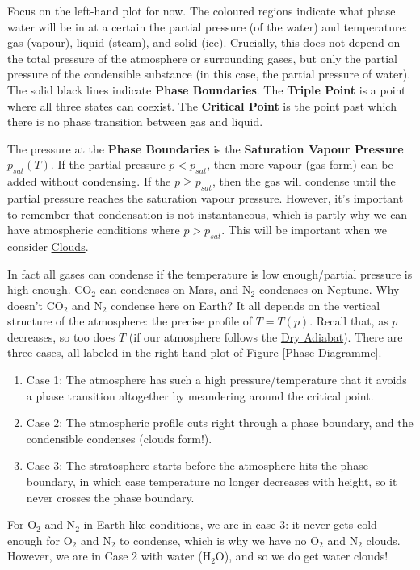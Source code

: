 Focus on the left-hand plot for now. The coloured regions indicate what phase water will be in at a certain the partial pressure (of the water) and temperature: gas (vapour), liquid (steam), and solid (ice). Crucially, this does not depend on the total pressure of the atmosphere or surrounding gases, but only the partial pressure of the condensible substance (in this case, the partial pressure of water). The solid black lines indicate \textbf{Phase Boundaries}. The \textbf{Triple Point} is a point where all three states can coexist. The \textbf{Critical Point} is the point past which there is no phase transition between gas and liquid.

The pressure at the \textbf{Phase Boundaries} is the \textbf{Saturation Vapour Pressure} $p_{sat}(T)$. If the partial pressure $p<p_{sat}$, then more vapour (gas form) can be added without condensing. If the $p\geq p_{sat}$, then the gas will condense until the partial pressure reaches the saturation vapour pressure. However, it's important to remember that condensation is not instantaneous, which is partly why we can have atmospheric conditions where $p>p_{sat}$. This will be important when we consider \hyperref[Clouds]{Clouds}.

In fact all gases can condense if the temperature is low enough/partial pressure is high enough. CO$_2$ can condenses on Mars, and N$_2$ condenses on Neptune. Why doesn't CO$_2$ and N$_2$ condense here on Earth? It all depends on the vertical structure of the atmosphere: the precise profile of $T=T(p)$. Recall that, as $p$ decreases, so too does $T$ (if our atmosphere follows the \hyperref[Dry Adiabat]{Dry Adiabat}). There are three cases, all labeled in the right-hand plot of Figure \ref{Phase Diagramme}.

\begin{enumerate}
    \item Case 1: The atmosphere has such a high pressure/temperature that it avoids a phase transition altogether by meandering around the critical point.
    \item Case 2: The atmospheric profile cuts right through a phase boundary, and the condensible condenses (clouds form!).
    \item Case 3: The stratosphere starts before the atmosphere hits the phase boundary, in which case temperature no longer decreases with height, so it never crosses the phase boundary.
\end{enumerate}

For O$_2$ and N$_2$ in Earth like conditions, we are in case 3: it never gets cold enough for O$_2$ and N$_2$ to condense, which is why we have no O$_2$ and N$_2$ clouds. However, we are in Case 2 with water (H$_2$O), and so we do get water clouds!

